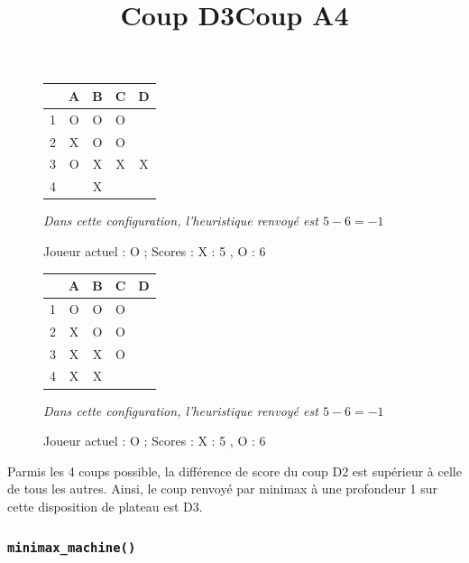 \documentclass{report}
\begin{document}
\begin{figure}[!h]
\begin{center}
\renewcommand{\arraystretch} {1.5}
    \begin{tabular}{c|c|c|c|c|}
          &A & B & C & D \\
        \hline
        1 & O & O & O & \\
        \hline
        2 & X & O & O &  \\
        \hline
        3 & O & X & X & X \\
        \hline
        4 &  & X &  &  \\
        \hline
    \end{tabular}

\end{center}
\begin{center}
    \title{Coup D3}
    \label{Figure 1}
    \caption{Joueur actuel : O ; Scores : X : 5 , O : 6}
    \textit{Dans cette configuration, l'heuristique renvoyé est $5-6=-1$}
\end{center}
\end{figure}

\begin{figure}[!h]
\begin{center}
\renewcommand{\arraystretch} {1.5}
    \begin{tabular}{c|c|c|c|c|}
          &A & B & C & D \\
        \hline
        1 & O & O & O & \\
        \hline
        2 & X & O & O &  \\
        \hline
        3 & X & X & O &  \\
        \hline
        4 & X & X &  &  \\
        \hline
    \end{tabular}

\end{center}
\begin{center}
    \title{Coup A4}
    \label{Figure 1}
    \caption{Joueur actuel : O ; Scores : X : 5 , O : 6}
    \textit{Dans cette configuration, l'heuristique renvoyé est $5-6=-1$}
\end{center}
\end{figure}

Parmis les 4 coups possible, la différence de score du coup D2 est supérieur à celle de tous les autres. Ainsi, le coup renvoyé par minimax à une profondeur 1 sur cette disposition de plateau est D3.

\subsubsection{\texttt{minimax\_machine()}}
\end{document}
